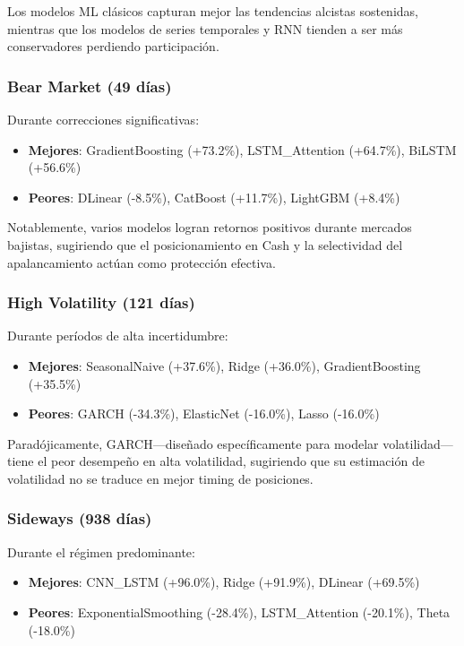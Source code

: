 Los modelos ML cl\'asicos capturan mejor las tendencias alcistas sostenidas, mientras que los modelos de series temporales y RNN tienden a ser m\'as conservadores perdiendo participaci\'on.

\subsubsection{Bear Market (49 d\'ias)}

Durante correcciones significativas:

\begin{itemize}
    \item \textbf{Mejores}: GradientBoosting (+73.2\%), LSTM\_Attention (+64.7\%), BiLSTM (+56.6\%)
    \item \textbf{Peores}: DLinear (-8.5\%), CatBoost (+11.7\%), LightGBM (+8.4\%)
\end{itemize}

Notablemente, varios modelos logran retornos positivos durante mercados bajistas, sugiriendo que el posicionamiento en Cash y la selectividad del apalancamiento act\'uan como protecci\'on efectiva.

\subsubsection{High Volatility (121 d\'ias)}

Durante per\'iodos de alta incertidumbre:

\begin{itemize}
    \item \textbf{Mejores}: SeasonalNaive (+37.6\%), Ridge (+36.0\%), GradientBoosting (+35.5\%)
    \item \textbf{Peores}: GARCH (-34.3\%), ElasticNet (-16.0\%), Lasso (-16.0\%)
\end{itemize}

Parad\'ojicamente, GARCH---dise\~nado espec\'ificamente para modelar volatilidad---tiene el peor desempe\~no en alta volatilidad, sugiriendo que su estimaci\'on de volatilidad no se traduce en mejor timing de posiciones.

\subsubsection{Sideways (938 d\'ias)}

Durante el r\'egimen predominante:

\begin{itemize}
    \item \textbf{Mejores}: CNN\_LSTM (+96.0\%), Ridge (+91.9\%), DLinear (+69.5\%)
    \item \textbf{Peores}: ExponentialSmoothing (-28.4\%), LSTM\_Attention (-20.1\%), Theta (-18.0\%)
\end{itemize}

